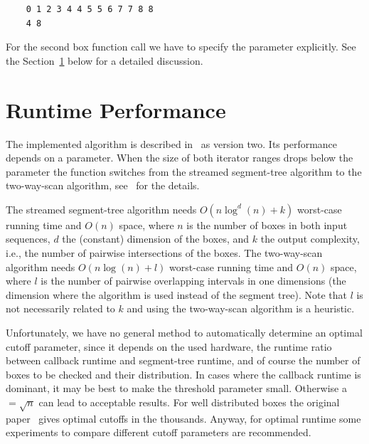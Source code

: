 \begin{verbatim}
    0 1 2 3 4 4 5 5 6 7 7 8 8 
    4 8 
\end{verbatim}

For the second box  function call we have to specify the
 parameter explicitly. See the
Section~\ref{sec:box-inters-performance} below for a detailed
discussion.



\section{Runtime Performance}\label{sec:box-inters-performance}

The implemented algorithm is described in~\cite{cgal:ze-fsbi-02} as
version two.  Its performance depends on a  parameter.
When the size of both iterator ranges drops below the 
parameter the function switches from the streamed segment-tree
algorithm to the two-way-scan algorithm, see~\cite{cgal:ze-fsbi-02}
for the details.

The streamed segment-tree algorithm needs $O(n \log^d (n) + k)$
worst-case running time and $O(n)$ space, where $n$ is the number of
boxes in both input sequences, $d$ the (constant) dimension of the
boxes, and $k$ the output complexity, i.e., the number of pairwise
intersections of the boxes. The two-way-scan algorithm needs $O(n \log
(n) + l)$ worst-case running time and $O(n)$ space, where $l$ is the
number of pairwise overlapping intervals in one dimensions (the
dimension where the algorithm is used instead of the segment tree).
Note that $l$ is not necessarily related to $k$ and using the
two-way-scan algorithm is a heuristic.

Unfortunately, we have no general method to automatically determine an
optimal cutoff parameter, since it depends on the used hardware, the
runtime ratio between callback runtime and segment-tree runtime, and
of course the number of boxes to be checked and their distribution. In
cases where the callback runtime is dominant, it may be best to make
the threshold parameter small. Otherwise a $=\sqrt{n}$ can
lead to acceptable results. For well distributed boxes the original
paper~\cite{cgal:ze-fsbi-02} gives optimal cutoffs in the thousands.
Anyway, for optimal runtime some experiments to compare different
cutoff parameters are recommended.

